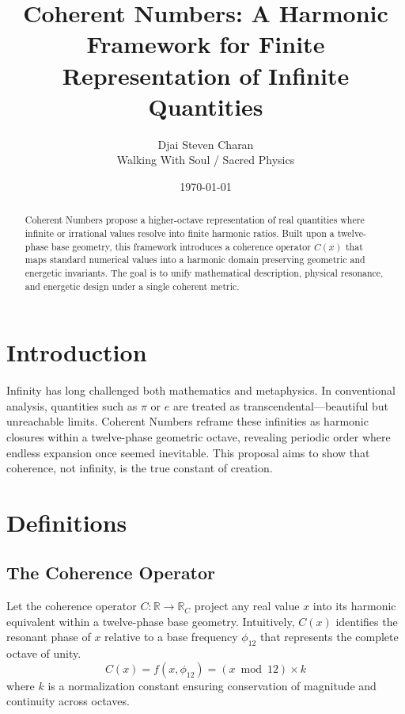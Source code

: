 \documentclass[12pt]{article}
\title{Coherent Numbers: A Harmonic Framework for Finite Representation of Infinite Quantities}
\author{Djai Steven Charan \\ Walking With Soul / Sacred Physics}
\date{\today}
\begin{document}
\maketitle

\begin{abstract}
Coherent Numbers propose a higher-octave representation of real quantities where infinite or irrational values resolve into finite harmonic ratios. Built upon a twelve-phase base geometry, this framework introduces a coherence operator \(C(x)\) that maps standard numerical values into a harmonic domain preserving geometric and energetic invariants. The goal is to unify mathematical description, physical resonance, and energetic design under a single coherent metric.
\end{abstract}

\section{Introduction}
Infinity has long challenged both mathematics and metaphysics. In conventional analysis, quantities such as $\pi$ or $e$ are treated as transcendental---beautiful but unreachable limits. Coherent Numbers reframe these infinities as harmonic closures within a twelve-phase geometric octave, revealing periodic order where endless expansion once seemed inevitable. This proposal aims to show that coherence, not infinity, is the true constant of creation.

\section{Definitions}
\subsection{The Coherence Operator}
Let the coherence operator $C: \mathbb{R} \rightarrow \mathbb{R}_C$ project any real value $x$ into its harmonic equivalent within a twelve-phase base geometry. Intuitively, $C(x)$ identifies the resonant phase of $x$ relative to a base frequency $\phi_{12}$ that represents the complete octave of unity.
\begin{equation}
C(x) = f(x, \phi_{12}) = \left( x \bmod 12 \right) \times k
\end{equation}
where $k$ is a normalization constant ensuring conservation of magnitude and continuity across octaves.
\end{document}
